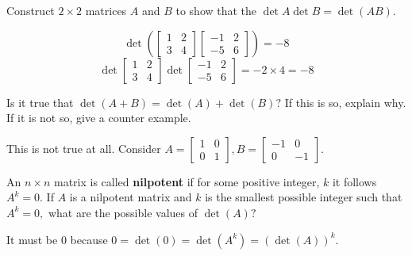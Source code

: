 \documentclass{ximera}
\begin{document}
\begin{problem}\label{prb:7.16} Construct $2\times 2$ matrices $A$ and $B$ to show that the
$\det A \det B = \det (AB)$.
\begin{hint}
\[
\det
\left( \left[
\begin{array}{cc}
1 & 2 \\
3 & 4
\end{array}
\right] \left[
\begin{array}{rr}
-1 & 2 \\
-5 & 6
\end{array}
\right] \right) = -8
\]
\[
\det \left[
\begin{array}{cc}
1 & 2 \\
3 & 4
\end{array}
\right] \det \left[
\begin{array}{rr}
-1 & 2 \\
-5 & 6
\end{array}
\right] = -2 \times 4 = -8
\]
\end{hint}
\end{problem}

\begin{problem}\label{prb:7.17} Is it true that $\det \left( A+B\right) =\det \left( A\right) +\det
\left( B\right) ?$ If this is so, explain why. If it is not so,
give a counter example.
\begin{hint}
This is not true at all. Consider $A=\left[
\begin{array}{cc}
1 & 0 \\
0 & 1
\end{array}
\right] ,B=\left[
\begin{array}{rr}
-1 & 0 \\
0 & -1
\end{array}
\right] .$
\end{hint}
\end{problem}

\begin{problem}\label{prb:7.18} An $n\times n$ matrix is called \textbf{nilpotent}
 if for some positive integer, $k$ it follows $A^{k}=0.$ If
$A$ is a nilpotent matrix and $k$ is the smallest possible integer such that
$A^{k}=0,$ what are the possible values of $\det \left( A\right) ?$
\begin{hint}
It must
be 0 because $0=\det \left( 0\right) =\det \left( A^{k}\right) =\left( \det
\left( A\right) \right) ^{k}.$
\end{hint}
\end{problem}
\end{document}
